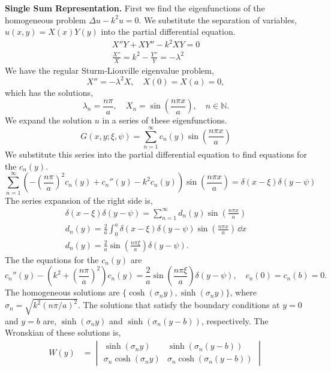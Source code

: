 {%
\begin{Solution}
  \textbf{Single Sum Representation.}
  First we find the eigenfunctions of the homogeneous problem
  $\Delta u - k^2 u = 0$.  We substitute the separation of variables,
  $u(x,y) = X(x) Y(y)$ into the partial differential equation.
  \begin{gather*}
    X'' Y + X Y'' - k^2 X Y = 0 \\
    \frac{X''}{X} = k^2 - \frac{Y''}{Y} = - \lambda^2
  \end{gather*}
  We have the regular Sturm-Liouville eigenvalue problem,
  \[
  X'' = - \lambda^2 X, \quad X(0) = X(a) = 0,
  \]
  which has the solutions,
  \[
  \lambda_n = \frac{n \pi}{a}, \quad
  X_n = \sin \left( \frac{n \pi x}{a} \right), \quad
  n \in \mathbb{N}.
  \]
  We expand the solution $u$ in a series of these eigenfunctions.
  \[
  G(x,y;\xi,\psi) = \sum_{n = 1}^\infty c_n(y) \sin \left( \frac{n \pi x}{a} \right)
  \]
  We substitute this series into the partial differential equation to 
  find equations for the $c_n(y)$.
  \[
  \sum_{n = 1}^\infty \left( - \left( \frac{n \pi}{a} \right)^2 c_n(y) + c_n''(y)
    - k^2 c_n(y) \right) \sin \left( \frac{n \pi x}{a} \right)
  = \delta(x - \xi) \delta(y - \psi)
  \]
  The series expansion of the right side is,
  \begin{gather*}
    \delta(x-\xi) \delta(y-\psi) = \sum_{n = 1}^\infty d_n(y) \sin \left(
      \frac{n \pi x}{a} \right) \\
    d_n(y) = \frac{2}{a} \int_0^a \delta(x-\xi) \delta(y-\psi)
    \sin \left( \frac{n \pi x}{a} \right) \,\dd x \\
    d_n(y) = \frac{2}{a} \sin \left( \frac{n \pi \xi}{a} \right) \delta(y-\psi).
  \end{gather*}
  The the equations for the $c_n(y)$ are
  \[
  c_n''(y) - \left( k^2 + \left( \frac{n \pi}{a} \right)^2 \right) c_n(y)
  = \frac{2}{a} \sin \left( \frac{n \pi \xi}{a} \right) \delta(y-\psi),
  \quad c_n(0) = c_n(b) = 0.
  \]
  The homogeneous solutions are $\{ \cosh(\sigma_n y), \sinh(\sigma_n y) \}$,
  where $\sigma_n = \sqrt{k^2 (n \pi/a)^2}$.  The solutions that satisfy 
  the boundary conditions at $y = 0$ and $y = b$ are, $\sinh(\sigma_n y)$
  and $\sinh(\sigma_n(y-b))$, respectively.  The Wronskian of these solutions
  is,
  \begin{align*}
    W(y)    &= \begin{vmatrix} \sinh(\sigma_n y) & \sinh(\sigma_n (y-b)) \\
      \sigma_n \cosh(\sigma_n y) & \sigma_n \cosh(\sigma_n(y-b))

\end{vmatrix}
\end{align*}
\end{Solution}}
